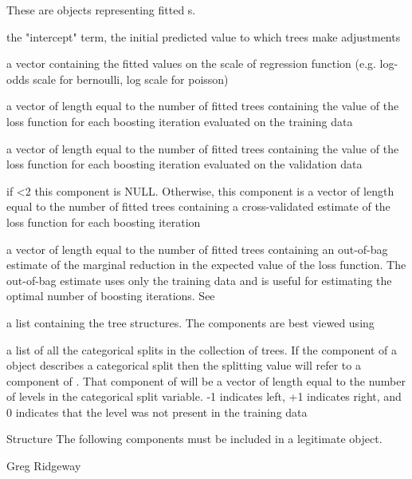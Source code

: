 \begin{Description}\relax
These are objects representing fitted s.
\end{Description}
\begin{Value}
\begin{ldescription}
\item[\code{initF}] the "intercept" term, the initial predicted value to which trees
make adjustments
\item[\code{fit}] a vector containing the fitted values on the scale of regression
function (e.g. log-odds scale for bernoulli, log scale for poisson)
\item[\code{train.error}] a vector of length equal to the number of fitted trees
containing the value of the loss function for each boosting iteration
evaluated on the training data
\item[\code{valid.error}] a vector of length equal to the number of fitted trees
containing the value of the loss function for each boosting iteration
evaluated on the validation data
\item[\code{cv.error}] if <2 this component is NULL. Otherwise, this 
component is a vector of length equal to the number of fitted trees
containing a cross-validated estimate of the loss function for each boosting 
iteration
\item[\code{oobag.improve}] a vector of length equal to the number of fitted trees
containing an out-of-bag estimate of the marginal reduction in the expected
value of the loss function. The out-of-bag estimate uses only the training
data and is useful for estimating the optimal number of boosting iterations.
See 
\item[\code{trees}] a list containing the tree structures. The components are best
viewed using 
\item[\code{c.splits}] a list of all the categorical splits in the collection of
trees. If the  component of a  object describes a
categorical split then the splitting value will refer to a component of
. That component of  will be a vector of length
equal to the number of levels in the categorical split variable. -1 indicates
left, +1 indicates right, and 0 indicates that the level was not present in the
training data
\end{ldescription}
\end{Value}
\begin{Section}{Structure}
The following components must be included in a legitimate  object.
\end{Section}
\begin{Author}\relax
Greg Ridgeway 
\end{Author}
\begin{SeeAlso}\relax
{}
\end{SeeAlso}


